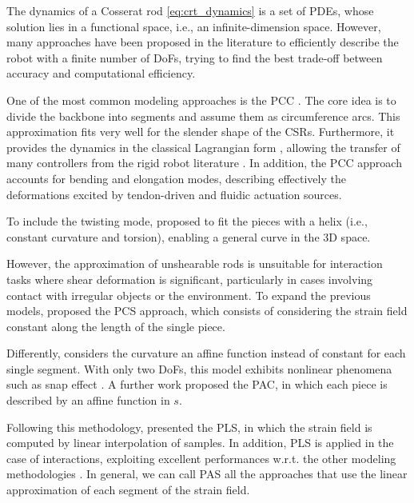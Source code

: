 The dynamics of a Cosserat rod \eqref{eq:crt_dynamics} is a set of \acp{PDE}, whose solution lies in a functional space, i.e., an infinite-dimension space. However, many approaches have been proposed in the literature to efficiently describe the robot with a finite number of \ac{DoFs}, trying to find the best trade-off between accuracy and computational efficiency.

One of the most common modeling approaches is the \ac{PCC} \cite{webster2010design}. The core idea is to divide the backbone into segments and assume them as circumference arcs. This approximation fits very well for the slender shape of the \acp{CSR}. Furthermore, it provides the dynamics in the classical Lagrangian form \cite{siciliano}, allowing the transfer of many controllers from the rigid robot literature \cite{della2018dynamic}. In addition, the \ac{PCC} approach accounts for bending and elongation modes, describing effectively the deformations excited by tendon-driven and fluidic actuation sources.

To include the twisting mode, \cite{grazioso2019geometrically} proposed to fit the pieces with a helix (i.e., constant curvature and torsion), enabling a general curve in the 3D space.

However, the approximation of unshearable rods is unsuitable for interaction tasks where shear deformation is significant, particularly in cases involving contact with irregular objects or the environment. To expand the previous models, \cite{renda2018discrete} proposed the \ac{PCS} approach, which consists of considering the strain field constant along the length of the single piece. 

Differently, \cite{della2020soft} considers the curvature an affine function instead of constant for each single segment.
With only two \ac{DoFs}, this model exhibits nonlinear phenomena such as snap effect \cite{armanini2017elastica, caradonna2024model}. A further work \cite{stella2023piecewise} proposed the \ac{PAC}, in which each piece is described by an affine function in $s$.

Following this methodology, \cite{li2023piecewise} presented the \ac{PLS}, in which the strain field is computed by linear interpolation of samples. In addition, \ac{PLS} is applied in the case of interactions, exploiting excellent performances w.r.t. the other modeling methodologies \cite{xun2024cosserat}.
In general, we can call \ac{PAS} all the approaches that use the linear approximation of each segment of the strain field. 

